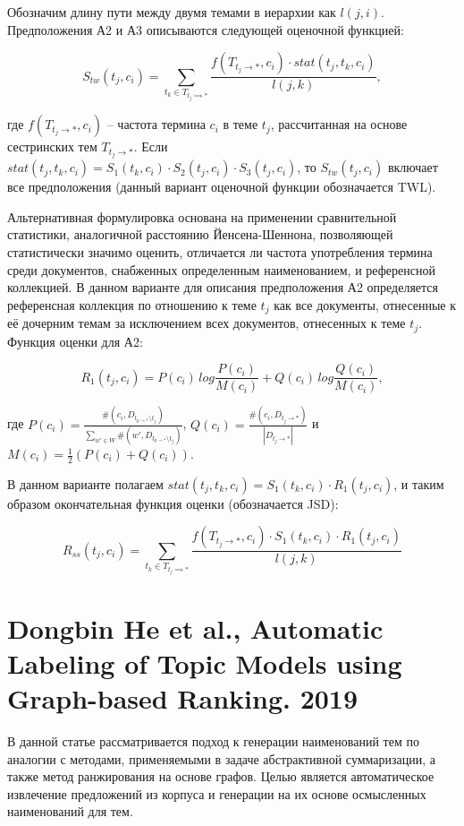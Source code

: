 Обозначим длину пути между двумя темами в иерархии как $l(j, i)$. Предположения А2 и А3 описываются следующей оценочной функцией:

\[ S_{tw}(t_j, c_i) = \sum_{t_k \in T_{t_j \implies *}} \frac{f(T_{t_j \to *}, c_i) \cdot stat(t_j, t_k, c_i)}{l(j,k)}, \]

\noindent где $f(T_{t_j \to *}, c_i)$ -- частота термина $c_i$ в теме $t_j$, рассчитанная на основе сестринских тем $T_{t_j \to *}$. Если $stat(t_j, t_k, c_i) = S_1(t_k, c_i) \cdot S_2(t_j, c_i) \cdot S_3(t_j, c_i)$, то $S_{tw}(t_j, c_i)$ включает все предположения (данный вариант оценочной функции обозначается TWL).

Альтернативная формулировка основана на применении сравнительной статистики, аналогичной расстоянию  Йенсена-Шеннона, позволяющей статистически значимо оценить, отличается ли частота употребления термина среди документов, снабженных определенным наименованием, и референсной коллекцией. В данном варианте для описания предположения А2 определяется референсная коллекция по отношению к теме $t_j$ как все документы, отнесенные к её дочерним темам за исключением всех документов, отнесенных к теме $t_j$. Функция оценки для А2:

\[ R_1(t_j, c_i) = P(c_i)\,log\frac{P(c_i)}{M(c_i)} + Q(c_i)\,log\frac{Q(c_i)}{M(c_i)}, \]

\noindent где $P(c_i) = \frac{\#(c_i, D_{t_{p \to *} \setminus t_j })}{ \sum_{w' \in W} \#(w', D_{t_{p \to *} \setminus t_j}) }$, $Q(c_i) = \frac{\#(c_i, D_{t_j \to *})}{|D_{t_j \to *}|}$ и $M(c_i) = \frac{1}{2}(P(c_i) + Q(c_i))$.

В данном варианте полагаем $stat(t_j, t_k, c_i) = S_1(t_k, c_i) \cdot R_1(t_j, c_i)$, и таким образом окончательная функция оценки (обозначается JSD):

\[ R_{ss}(t_j, c_i) = \sum_{t_k \in T_{t_j \implies *}} \frac{f(T_{t_j \to *}, c_i) \cdot S_1(t_k, c_i) \cdot R_1(t_j, c_i)  }{l(j,k)}    \]



\section{Dongbin He et al., Automatic Labeling of Topic Models using Graph-based Ranking. 2019}

В данной статье рассматривается подход к генерации наименований тем по аналогии с методами, применяемыми в задаче абстрактивной суммаризации, а также метод ранжирования на основе графов. Целью является автоматическое извлечение предложений из корпуса и генерации на их основе осмысленных наименований для тем.

